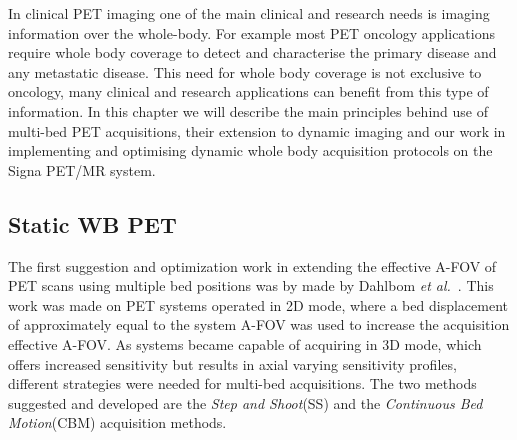 In clinical PET imaging one of the main clinical and research needs is imaging information over the whole-body. For example most PET oncology applications require whole body coverage to detect and characterise the primary disease and any metastatic disease. This need for whole body coverage is not exclusive to oncology, many clinical and research applications can benefit from this type of information. In this chapter we will describe the main principles behind use of multi-bed PET acquisitions, their extension to dynamic imaging and our work in implementing and optimising dynamic whole body acquisition protocols on the Signa PET/MR system. 

\subsection{Static WB PET}
The first suggestion and optimization work in extending the effective A-FOV of PET scans using multiple bed positions was by made by Dahlbom \textit{et al.}~\cite{Dahlbom1992}. This work was made on PET systems operated in 2D mode, where a bed displacement of approximately equal to the system A-FOV was used to increase the acquisition effective A-FOV. As systems became capable of acquiring in 3D mode, which offers increased sensitivity but results in axial varying sensitivity profiles, different strategies were needed for multi-bed acquisitions. The two methods suggested and developed are the \textit{Step and Shoot}(SS) and the \textit{Continuous Bed Motion}(CBM) acquisition methods. 

